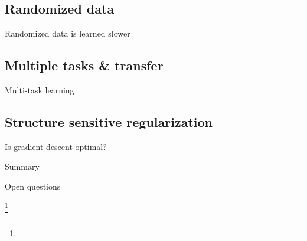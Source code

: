 \documentclass{beamer}
\newcommand\blfootnote[1]{%
  \begingroup
  \renewcommand\thefootnote{}\footnote{#1}%
  \addtocounter{footnote}{-1}%
  \endgroup
}
\begin{document}
\subsection{Randomized data}
\begin{frame}{Randomized data is learned slower}
\end{frame}

\subsection{Multiple tasks \& transfer}
\begin{frame}{Multi-task learning}
\end{frame}

\subsection{Structure sensitive regularization}
\begin{frame}{Is gradient descent optimal?}
\end{frame}


\begin{frame}{Summary}

\end{frame}

\begin{frame}{Open questions}

\end{frame}

\begin{frame}[allowframebreaks]

\blfootnote{}
\end{frame}
\end{document}
